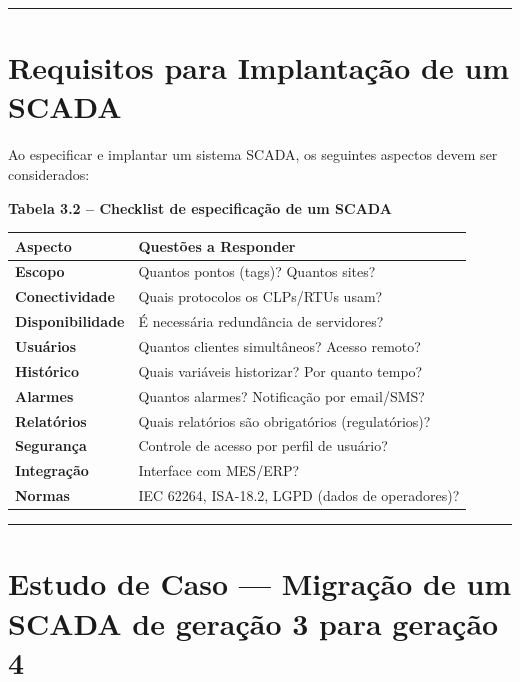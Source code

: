 \begin{center}\rule{0.5\linewidth}{0.5pt}\end{center}

\section{Requisitos para Implantação de um SCADA}\label{requisitos-para-implantauxe7uxe3o-de-um-scada}

Ao especificar e implantar um sistema SCADA, os seguintes aspectos devem ser considerados:

\textbf{Tabela 3.2 -- Checklist de especificação de um SCADA}

\begin{longtable}[]{@{}ll@{}}
\toprule\noalign{}
Aspecto & Questões a Responder \\
\midrule\noalign{}
\endhead
\bottomrule\noalign{}
\endlastfoot
\textbf{Escopo} & Quantos pontos (tags)? Quantos sites? \\
\textbf{Conectividade} & Quais protocolos os CLPs/RTUs usam? \\
\textbf{Disponibilidade} & É necessária redundância de servidores? \\
\textbf{Usuários} & Quantos clientes simultâneos? Acesso remoto? \\
\textbf{Histórico} & Quais variáveis historizar? Por quanto tempo? \\
\textbf{Alarmes} & Quantos alarmes? Notificação por email/SMS? \\
\textbf{Relatórios} & Quais relatórios são obrigatórios (regulatórios)? \\
\textbf{Segurança} & Controle de acesso por perfil de usuário? \\
\textbf{Integração} & Interface com MES/ERP? \\
\textbf{Normas} & IEC 62264, ISA-18.2, LGPD (dados de operadores)? \\
\end{longtable}

\begin{center}\rule{0.5\linewidth}{0.5pt}\end{center}

\section{\texorpdfstring{Estudo de Caso --- Migração de um SCADA de geração 3 para geração 4}{Estudo de Caso  Migração de um SCADA de geração 3 para geração 4}}\label{estudo-de-caso-migrauxe7uxe3o-de-um-scada-de-gerauxe7uxe3o-3-para-gerauxe7uxe3o-4}

